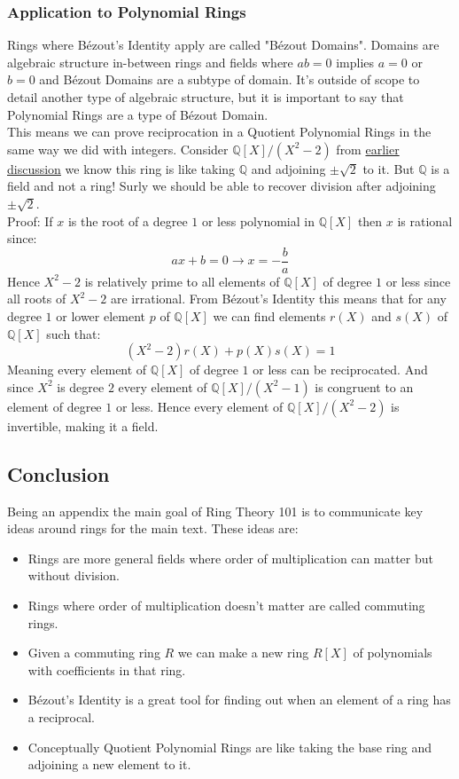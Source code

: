 \subsubsection{Application to Polynomial Rings}
Rings where Bézout's Identity apply are called "Bézout Domains".
Domains are algebraic structure in-between rings and fields where $ab=0$ implies $a=0$ or $b=0$ and Bézout Domains are a subtype of domain.
It's outside of scope to detail another type of algebraic structure,
but it is important to say that Polynomial Rings are a type of Bézout Domain.
\\

This means we can prove reciprocation in a Quotient Polynomial Rings in the same way we did with integers.
Consider $\mathbb{Q}[X]/(X^2-2)$ from \hyperref[appx:quotient-polynomial-ring]{earlier discussion} we know this ring is like taking $\mathbb{Q}$ and adjoining $\pm\sqrt{2}$ to it.
But $\mathbb{Q}$ is a field and not a ring!
Surly we should be able to recover division after adjoining $\pm\sqrt{2}$.
\\

Proof:
If $x$ is the root of a degree $1$ or less polynomial in $\mathbb{Q}[X]$ then $x$ is rational since:
\[ ax+b = 0 \rightarrow x = -\frac{b}{a}\]
Hence $X^2-2$ is relatively prime to all elements of $\mathbb{Q}[X]$ of degree $1$ or less since all roots of $X^2-2$ are irrational.
From Bézout's Identity this means that for any degree $1$ or lower element $p$ of $\mathbb{Q}[X]$ we can find elements $r(X)$ and $s(X)$ of $\mathbb{Q}[X]$ such that:
\[(X^2-2)r(X)+p(X)s(X) = 1\]
Meaning every element of $\mathbb{Q}[X]$ of degree $1$ or less can be reciprocated.
And since $X^2$ is degree $2$ every element of $\mathbb{Q}[X]/(X^2-1)$ is congruent to an element of degree $1$ or less.
Hence every element of $\mathbb{Q}[X] / (X^2 - 2)$ is invertible,
making it a field.

\subsection{Conclusion}
Being an appendix the main goal of Ring Theory 101 is to communicate key ideas around rings for the main text.
These ideas are:
\begin{itemize}
	\item Rings are more general fields where order of multiplication can matter but without division.
	\item Rings where order of multiplication doesn't matter are called commuting rings.
	\item Given a commuting ring $R$ we can make a new ring $R[X]$ of polynomials with coefficients in that ring.
	\item Bézout's Identity is a great tool for finding out when an element of a ring has a reciprocal.
	\item Conceptually Quotient Polynomial Rings are like taking the base ring and adjoining a new element to it.
\end{itemize}
